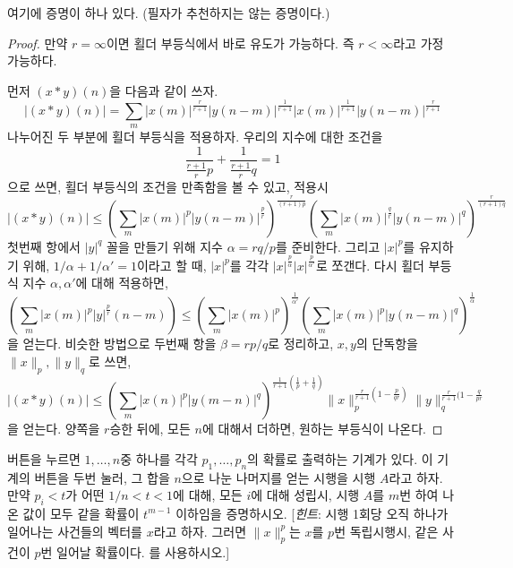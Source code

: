 여기에 증명이 하나 있다. (필자가 추천하지는 않는 증명이다.)
\begin{proof}
    만약 $r = \infty$이면 횔더 부등식에서 바로 유도가 가능하다.
    즉 $r < \infty$라고 가정 가능하다.

    먼저 $(x * y)(n)$을 다음과 같이 쓰자.
    \begin{equation*}
        |(x * y)(n)| = \sum_m |x(m)|^{\frac{r}{r + 1}} |y(n - m)|^{\frac{1}{r + 1}} |x(m)|^{\frac{1}{r + 1}} |y(n - m)|^{\frac{r}{r + 1}}
    \end{equation*}
    나누어진 두 부분에 횔더 부등식을 적용하자.
    우리의 지수에 대한 조건을
    \begin{equation*}
        \frac{1}{\frac{r + 1}{r} p} + \frac{1}{\frac{r + 1}{r} q} = 1
    \end{equation*}
    으로 쓰면, 횔더 부등식의 조건을 만족함을 볼 수 있고, 적용시
    \begin{equation*}
        |(x * y)(n)| \leq \left( \sum_m |x(m)|^p |y(n - m)|^{\frac{p}{r}}\right)^{\frac{r}{(r + 1)p}} \left( \sum_m |x(m)|^{\frac{q}{r}} |y(n - m)|^q\right)^{\frac{r}{(r + 1)q}}
    \end{equation*}
    첫번째 항에서 $|y|^q$ 꼴을 만들기 위해 지수 $\alpha = rq/p$를 준비한다.
    그리고 $|x|^p$를 유지하기 위해, $1/\alpha + 1/\alpha' = 1$이라고 할 때, $|x|^p$를 각각 $|x|^{\frac{p}{\alpha}}|x|^{\frac{p}{\alpha'}}$로 쪼갠다.
    다시 횔더 부등식 지수 $\alpha, \alpha'$에 대해 적용하면,
    \begin{equation*}
        \left( \sum_m |x(m)|^p |y|^{\frac{p}{r}}(n - m)\right) \leq \left(\sum_m |x(m)|^p \right)^{\frac{1}{\alpha'}} \left(\sum_m |x(m)|^p |y(n - m)|^q \right)^{\frac{1}{\alpha}}
    \end{equation*}
    을 얻는다.
    비슷한 방법으로 두번째 항을 $\beta = rp/q$로 정리하고, $x, y$의 단독항을 $\|x\|_p, \|y\|_q$로 쓰면,
    \begin{equation*}
        |(x * y)(n)| \leq \left( \sum_m |x(n)|^p |y(m - n)|^q \right)^{\frac{1}{r + 1} (\frac{1}{p} + \frac{1}{q})} \|x\|_p^{\frac{r}{r + 1}(1 - \frac{p}{qr})} \|y\|_q^{\frac{r}{r + 1}(1 - \frac{q}{pr}}
    \end{equation*}
    을 얻는다.
    양쪽을 $r$승한 뒤에, 모든 $n$에 대해서 더하면, 원하는 부등식이 나온다.
\end{proof}

\begin{exercise}
    버튼을 누르면 $1, \dots, n$중 하나를 각각 $p_1, \dots, p_n$의 확률로 출력하는 기계가 있다.
    이 기계의 버튼을 두번 눌러, 그 합을 $n$으로 나눈 나머지를 얻는 시행을 시행 $A$라고 하자.
    만약 $p_i < t$가 어떤 $1/n < t < 1$에 대해, 모든 $i$에 대해 성립시, 시행 $A$를 $m$번 하여 나온 값이 모두 같을 확률이 $t^{m - 1}$ 이하임을 증명하시오.
    [\textit{힌트}: 시행 1회당 오직 하나가 일어나는 사건들의 벡터를 $x$라고 하자. 그러면 $\|x\|^p_p$는 $x$를 $p$번 독립시행시, 같은 사건이 $p$번 일어날 확률이다. 를 사용하시오.]
\end{exercise}

